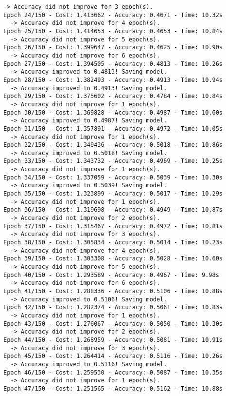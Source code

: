 \documentclass[11pt]{article}
\begin{document}
\begin{Verbatim}[commandchars=\\\{\}]
  -> Accuracy did not improve for 3 epoch(s).
Epoch 24/150 - Cost: 1.413662 - Accuracy: 0.4671 - Time: 10.32s
  -> Accuracy did not improve for 4 epoch(s).
Epoch 25/150 - Cost: 1.414653 - Accuracy: 0.4653 - Time: 10.84s
  -> Accuracy did not improve for 5 epoch(s).
Epoch 26/150 - Cost: 1.399647 - Accuracy: 0.4625 - Time: 10.90s
  -> Accuracy did not improve for 6 epoch(s).
Epoch 27/150 - Cost: 1.394505 - Accuracy: 0.4813 - Time: 10.26s
  -> Accuracy improved to 0.4813! Saving model.
Epoch 28/150 - Cost: 1.382493 - Accuracy: 0.4913 - Time: 10.94s
  -> Accuracy improved to 0.4913! Saving model.
Epoch 29/150 - Cost: 1.375602 - Accuracy: 0.4784 - Time: 10.84s
  -> Accuracy did not improve for 1 epoch(s).
Epoch 30/150 - Cost: 1.369828 - Accuracy: 0.4987 - Time: 10.60s
  -> Accuracy improved to 0.4987! Saving model.
Epoch 31/150 - Cost: 1.357891 - Accuracy: 0.4972 - Time: 10.05s
  -> Accuracy did not improve for 1 epoch(s).
Epoch 32/150 - Cost: 1.349436 - Accuracy: 0.5018 - Time: 10.86s
  -> Accuracy improved to 0.5018! Saving model.
Epoch 33/150 - Cost: 1.343732 - Accuracy: 0.4969 - Time: 10.25s
  -> Accuracy did not improve for 1 epoch(s).
Epoch 34/150 - Cost: 1.337059 - Accuracy: 0.5039 - Time: 10.30s
  -> Accuracy improved to 0.5039! Saving model.
Epoch 35/150 - Cost: 1.323899 - Accuracy: 0.5017 - Time: 10.29s
  -> Accuracy did not improve for 1 epoch(s).
Epoch 36/150 - Cost: 1.319698 - Accuracy: 0.4949 - Time: 10.87s
  -> Accuracy did not improve for 2 epoch(s).
Epoch 37/150 - Cost: 1.315467 - Accuracy: 0.4972 - Time: 10.81s
  -> Accuracy did not improve for 3 epoch(s).
Epoch 38/150 - Cost: 1.305834 - Accuracy: 0.5014 - Time: 10.23s
  -> Accuracy did not improve for 4 epoch(s).
Epoch 39/150 - Cost: 1.303308 - Accuracy: 0.5028 - Time: 10.60s
  -> Accuracy did not improve for 5 epoch(s).
Epoch 40/150 - Cost: 1.293589 - Accuracy: 0.4967 - Time: 9.98s
  -> Accuracy did not improve for 6 epoch(s).
Epoch 41/150 - Cost: 1.288336 - Accuracy: 0.5106 - Time: 10.88s
  -> Accuracy improved to 0.5106! Saving model.
Epoch 42/150 - Cost: 1.282374 - Accuracy: 0.5061 - Time: 10.83s
  -> Accuracy did not improve for 1 epoch(s).
Epoch 43/150 - Cost: 1.276067 - Accuracy: 0.5050 - Time: 10.30s
  -> Accuracy did not improve for 2 epoch(s).
Epoch 44/150 - Cost: 1.268959 - Accuracy: 0.5081 - Time: 10.91s
  -> Accuracy did not improve for 3 epoch(s).
Epoch 45/150 - Cost: 1.264414 - Accuracy: 0.5116 - Time: 10.26s
  -> Accuracy improved to 0.5116! Saving model.
Epoch 46/150 - Cost: 1.259530 - Accuracy: 0.5087 - Time: 10.35s
  -> Accuracy did not improve for 1 epoch(s).
Epoch 47/150 - Cost: 1.251565 - Accuracy: 0.5162 - Time: 10.88s

\end{Verbatim}
\end{document}
